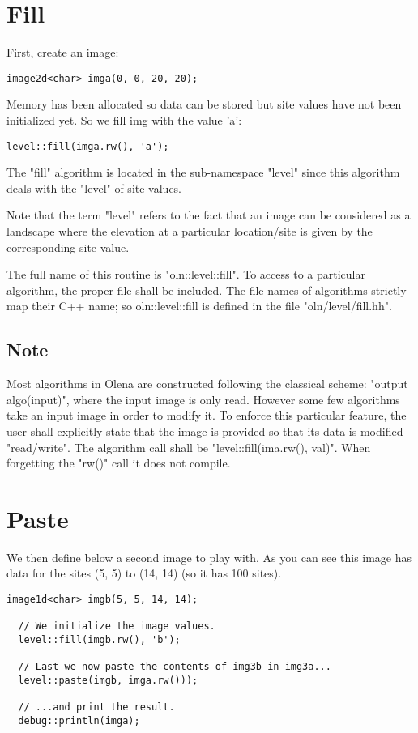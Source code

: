 \documentclass{report}
\begin{document}
\section{Fill}
First, create an image:
\begin{lstlisting}[frame=single]
  image2d<char> imga(0, 0, 20, 20);
\end{lstlisting}

Memory has been allocated so data can be stored but site values
have not been initialized yet.  So we fill img with the value 'a':
\begin{lstlisting}[frame=single]
  level::fill(imga.rw(), 'a');
\end{lstlisting}

The "fill" algorithm is located in the sub-namespace "level" since this
algorithm deals with the "level" of site values.

Note that the term "level" refers to the fact that an image can be considered as
a landscape where the elevation at a particular location/site is given by
the corresponding site value.

The full name of this routine is "oln::level::fill".  To access to a particular
algorithm, the proper file shall be included. The file names of algorithms
strictly map their C++ name; so oln::level::fill is defined in the file
"oln/level/fill.hh".

\subsection*{Note}
Most algorithms in Olena are constructed following the classical scheme: "output
algo(input)", where the input image is only read. However some few algorithms
take an input image in order to modify it.  To enforce this particular feature,
the user shall explicitly state that the image is provided so that its data is
modified "read/write". The algorithm call shall be "level::fill(ima.rw(),
val)". When forgetting the "rw()" call it does not compile.


\section{Paste}
We then define below a second image to play with.  As you can see this image has
data for the sites (5, 5) to (14, 14) (so it has 100 sites).  

\begin{lstlisting}[frame=single]
  image1d<char> imgb(5, 5, 14, 14);

  // We initialize the image values.
  level::fill(imgb.rw(), 'b');

  // Last we now paste the contents of img3b in img3a...
  level::paste(imgb, imga.rw()));

  // ...and print the result.
  debug::println(imga);
\end{lstlisting}
\end{document}
